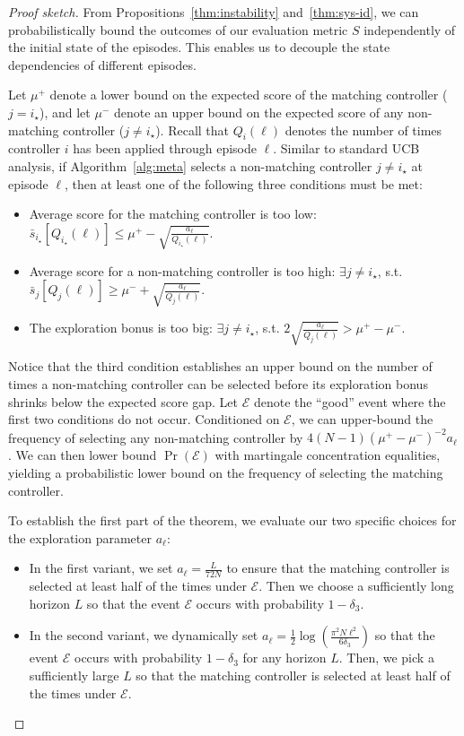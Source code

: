 \documentclass[11pt, twoside]{article}
\theoremstyle{definition}
\begin{document}
\begin{proof}[Proof sketch]
From Propositions~\ref{thm:instability} and~\ref{thm:sys-id}, we can probabilistically bound the outcomes of our evaluation metric $S$ independently of the initial state of the episodes.
This enables us to decouple the state dependencies of different episodes.

Let $\mu^+$ denote a lower bound on the expected score of the matching controller ($j = i_\star$), and let $\mu^-$ denote an upper bound on the expected score of any non-matching controller ($j \neq i_\star$).
Recall that $Q_i(\ell)$ denotes the number of times controller $i$ has been applied through episode $\ell$.
Similar to standard UCB analysis, if Algorithm~\ref{alg:meta} selects a non-matching controller $j \neq i_\star$ at episode $\ell$, then at least one of the following three conditions must be met:
\begin{itemize}[wide, labelindent=3pt]
    \item Average score for the matching controller is too low: $\bar{s}_{i_\star}[Q_{i_\star}(\ell)] \le \mu^+ - \sqrt{\frac{a_\ell}{Q_{i_\star}(\ell)}}$.
    \item Average score for a non-matching controller is too high: $\exists j \neq i_\star$, s.t. $\bar{s}_j[Q_j(\ell)] \ge \mu^- + \sqrt{\frac{a_\ell}{Q_j(\ell)}}$.
    \item The exploration bonus is too big:  $\exists j \neq i_\star$, s.t. $2 \sqrt{\frac{a_\ell}{Q_j(\ell)}} > \mu^+ - \mu^-$.
\end{itemize}
Notice that the third condition establishes an upper bound on the number of times a non-matching controller can be selected before its exploration bonus shrinks below the expected score gap.
Let $\mathcal{E}$ denote the ``good'' event where the first two conditions do not occur.
Conditioned on $\mathcal{E}$, we can upper-bound the frequency of selecting any non-matching controller by $4(N-1)(\mu^+ - \mu^-)^{-2} a_\ell$.
We can then lower bound $\Pr(\mathcal{E})$ with martingale concentration equalities, yielding a probabilistic lower bound on the frequency of selecting the matching controller.

To establish the first part of the theorem, we evaluate our two specific choices for the exploration parameter $a_\ell$:
\begin{itemize}[wide, labelindent=3pt]
    \item In the first variant, we set $a_\ell = \frac{L}{72N}$ to ensure that the matching controller is selected at least half of the times under $\mathcal{E}$. Then we choose a sufficiently long horizon $L$ so that the event $\mathcal{E}$ occurs with probability $1-\delta_3$.
    \item In the second variant, we dynamically set $a_\ell = \frac{1}{2} \log(\frac{\pi^2 N \ell^2}{6\delta_3})$ so that the event $\mathcal{E}$ occurs with probability $1-\delta_3$ for any horizon $L$.
    Then, we pick a sufficiently large $L$ so that the matching controller is selected at least half of the times under $\mathcal{E}$.
\end{itemize}


\end{proof}
\end{document}
